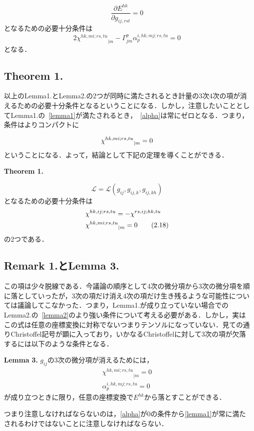 \documentclass[main]{subfiles}
\begin{document}
\begin{equation*}
    \dfrac{\partial E^{hk}}{\partial g_{ij,rst} }=0
\end{equation*}
となるための必要十分条件は
\begin{equation*}
    {2\chi ^{hk,mi;rs,tu}}_{|m} - \varGamma ^p _{jm}\alpha _p ^{i,hk,mj;rs,tu} = 0
    \label{lemma2}\tag{2.17}
\end{equation*}
となる．

\subsection{Theorem 1.}
以上のLemma1.とLemma2.の2つが同時に満たされるとき計量の3次4次の項が消えるための必要十分条件となるということになる．しかし，注意したいこととしてLemma1.の~\eqref{lemma1}が満たされるとき，~\eqref{alpha}は常にゼロとなる．つまり，条件はよりコンパクトに

\begin{equation*}
    {\chi^{hk,mi;rs,tu}}_{|m} =0
\end{equation*}
ということになる．よって，結論として下記の定理を導くことができる．

\textbf{Theorem 1.}

\begin{equation*}
    \mathscr{L}= \mathscr{L}(g_{ij}, g_{ij,k}, g_{ij,kh})
\end{equation*}
となるための必要十分条件は
\begin{align*}
    &\chi^{hk,ij;rs,tu}= -\chi^{rs,ij;hk,tu}\\
    &{\chi ^{hk,mi;rs,tu}}_{|m} =0
    \tag{2.18} \label{thm1}
\end{align*}
の2つである．

\subsection{Remark 1.とLemma 3.}
この項は少々脱線である．今議論の順序として4次の微分項から3次の微分項を順に落としていったが，3次の項だけ消え4次の項だけ生き残るような可能性については議論してこなかった．つまり，Lemma1.が成り立っていない場合でのLemma2.の~\eqref{lemma2}のより強い条件について考える必要がある．しかし，実はこの式は任意の座標変換に対称でないつまりテンソルになっていない．見ての通りChristoffel記号が顕に入っており，いかなるChristoffelに対して3次の項が欠落するには以下のような条件となる．

\textbf{Lemma 3.}
\(g_{ij}\)の3次の微分項が消えるためには，
\begin{align*}
    {\chi ^{hk,mi;rs,tu}}_{|m} =0\\
    \alpha _p ^{i,hk,mj;rs,tu} =0
\end{align*}
が成り立つときに限り，任意の座標変換で\(E^{hk}\)から落とすことができる．

つまり注意しなければならないのは，\eqref{alpha}が0の条件から\eqref{lemma1}が常に満たされるわけではないことに注意しなければならない．
\end{document}
